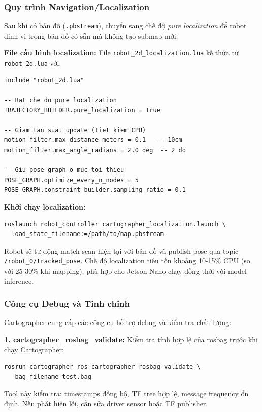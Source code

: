 \subsubsection{Quy trình Navigation/Localization}
\label{subsec:navigation_workflow}

Sau khi có bản đồ (\texttt{.pbstream}), chuyển sang chế độ \textit{pure localization} để robot định vị trong bản đồ có sẵn mà không tạo submap mới.

\textbf{File cấu hình localization:} File \texttt{robot\_2d\_localization.lua} kế thừa từ \texttt{robot\_2d.lua} với:
\begin{lstlisting}[basicstyle=\small\ttfamily, caption={Cấu hình Cartographer cho localization}, label={lst:carto_localization}]
include "robot_2d.lua"

-- Bat che do pure localization
TRAJECTORY_BUILDER.pure_localization = true

-- Giam tan suat update (tiet kiem CPU)
motion_filter.max_distance_meters = 0.1   -- 10cm
motion_filter.max_angle_radians = 2.0 deg  -- 2 do

-- Giu pose graph o muc toi thieu
POSE_GRAPH.optimize_every_n_nodes = 5
POSE_GRAPH.constraint_builder.sampling_ratio = 0.1
\end{lstlisting}

\textbf{Khởi chạy localization:}
\begin{verbatim}
roslaunch robot_controller cartographer_localization.launch \
  load_state_filename:=/path/to/map.pbstream
\end{verbatim}

Robot sẽ tự động match scan hiện tại với bản đồ và publish pose qua topic \texttt{/robot\_0/tracked\_pose}. Chế độ localization tiêu tốn khoảng 10-15\% CPU (so với 25-30\% khi mapping), phù hợp cho Jetson Nano chạy đồng thời với model inference.

\subsubsection{Công cụ Debug và Tinh chỉnh}
\label{subsec:debug_tools}

Cartographer cung cấp các công cụ hỗ trợ debug và kiểm tra chất lượng:

\textbf{1. cartographer\_rosbag\_validate:} Kiểm tra tính hợp lệ của rosbag trước khi chạy Cartographer:
\begin{verbatim}
rosrun cartographer_ros cartographer_rosbag_validate \
  -bag_filename test.bag
\end{verbatim}
Tool này kiểm tra: timestamps đồng bộ, TF tree hợp lệ, message frequency ổn định. Nếu phát hiện lỗi, cần sửa driver sensor hoặc TF publisher.

